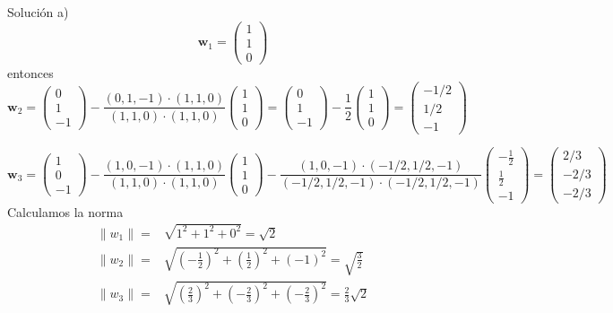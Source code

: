 \documentclass[
]{article}
\begin{document}
Solución a) \[
\mathbf{w}_1=\begin{pmatrix} 1 \\ 1 \\ 0 \end{pmatrix}
\] entonces \[
\mathbf{w}_2=\begin{pmatrix} 0 \\ 1 \\ -1 \end{pmatrix} - \frac{(0,1,-1)\cdot(1,1,0)}{(1,1,0)\cdot (1,1,0)}\begin{pmatrix} 1\\ 1 \\ 0\end{pmatrix} =\begin{pmatrix} 0 \\ 1 \\ -1 \end{pmatrix} - \frac{1}{2}\begin{pmatrix} 1\\ 1 \\ 0\end{pmatrix} =
\begin{pmatrix} -1/2\\ 1/2 \\ -1\end{pmatrix}
\]

\[
\mathbf{w}_3=
\begin{pmatrix} 1 \\ 0 \\ -1 \end{pmatrix} - \frac{(1,0,-1)\cdot(1,1,0)}{(1,1,0)\cdot (1,1,0)}
\begin{pmatrix} 1\\ 1 \\ 0\end{pmatrix}  - \frac{(1,0,-1)\cdot(-1/2,1/2,-1)}{(-1/2,1/2,-1)\cdot(-1/2,1/2,-1)}
\begin{pmatrix} -\frac{1}{2}\\ \frac{1}{2} \\ -1\end{pmatrix} =
\begin{pmatrix} 2/3 \\ -2/3 \\ -2/3\end{pmatrix}
\] Calculamos la norma \[
\begin{matrix} 
  \|w_1\|= & \sqrt{1^2 + 1^2 +0^2}=\sqrt{2} \\
  \|w_2\|= & \sqrt{(-\frac{1}{2})^2 + (\frac{1}{2})^2+ (-1)^2} = \sqrt{\frac{3}{2}}\\
  \|w_3\|= & \sqrt{(\frac{2}{3})^2 + (-\frac{2}{3})^2+ (-\frac{2}{3})^2} = \frac{2}{3}\sqrt{2}
\end{matrix}
\]
\end{document}
